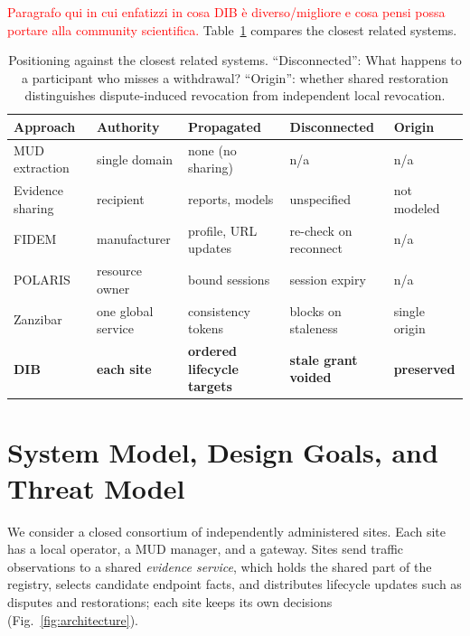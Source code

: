 \documentclass[journal]{IEEEtran}
\theoremstyle{definition}
\begin{document}
\textcolor{red}{Paragrafo qui in cui enfatizzi in cosa DIB è diverso/migliore e cosa pensi possa portare alla community scientifica.} Table~\ref{tab:positioning} compares the closest related systems. 

\begin{table}[ht]
\centering
\caption{Positioning against the closest related systems.
``Disconnected'': What happens to a participant who misses a withdrawal?
``Origin'': whether shared restoration distinguishes dispute-induced revocation from independent local revocation.}
\label{tab:positioning}
\scriptsize
\setlength{\tabcolsep}{3pt}
\renewcommand{\arraystretch}{1.05}
\begin{tabular}{@{}>{\raggedright\arraybackslash}p{1.52cm}>{\raggedright\arraybackslash}p{1.32cm}>{\raggedright\arraybackslash}p{1.84cm}>{\raggedright\arraybackslash}p{1.56cm}>{\raggedright\arraybackslash}p{1.26cm}@{}}
\toprule
Approach & Authority & Propagated & Disconnected & Origin \\
\midrule
MUD extraction~\cite{clearasmud, hamzatdsc, mudscope} & single domain & none (no sharing) & n/a & n/a \\
Evidence sharing~\cite{wagner2016misp, stix21, colearn} & recipient & reports, models & unspecified & not modeled \\
FIDEM~\cite{fidem} & manufacturer & profile, URL updates & re-check on reconnect & n/a \\
POLARIS~\cite{polaris} & resource owner & bound sessions & session expiry & n/a \\
Zanzibar~\cite{zanzibar} & one global service & consistency tokens & blocks on staleness & single origin \\
\textbf{DIB} & \textbf{each site} & \textbf{ordered lifecycle targets} & \textbf{stale grant voided} & \textbf{preserved} \\
\bottomrule
\end{tabular}
\end{table}



\section{System Model, Design Goals, and Threat Model}
\label{sec:threat}

We consider a closed consortium of independently administered sites. Each site has a local operator, a MUD manager, and a gateway. Sites send traffic observations to a shared \emph{evidence service}, which holds the shared part of the registry, selects candidate endpoint facts, and distributes lifecycle updates such as disputes and restorations; each site keeps its own decisions (Fig.~\ref{fig:architecture}).
\end{document}
